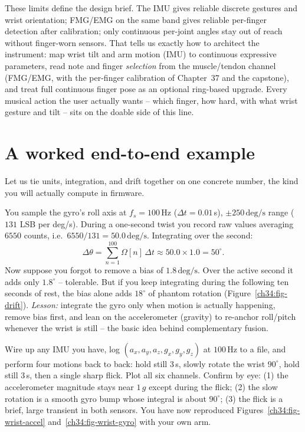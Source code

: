 \begin{aestheticbox}
These limits define the design brief. The IMU gives reliable
discrete gestures and wrist orientation; FMG/EMG on the same band gives reliable
per-finger detection after calibration; only continuous per-joint angles stay out of
reach without finger-worn sensors. That tells us exactly how to architect the
instrument: map wrist tilt and arm motion (IMU) to continuous expressive parameters,
read note and finger \emph{selection} from the muscle/tendon channel (FMG/EMG, with the
per-finger calibration of Chapter~37 and the capstone), and treat full continuous finger
pose as an optional ring-based upgrade. Every musical action the user actually wants --
which finger, how hard, with what wrist gesture and tilt -- sits on the doable side of
this line.
\end{aestheticbox}

\section{A worked end-to-end example}
\label{ch34:worked}

Let us tie units, integration, and drift together on one concrete number, the kind you
will actually compute in firmware.

\begin{example}
\label{ch34:ex-twist}
You sample the gyro's roll axis at $f_s = 100\,\mathrm{Hz}$ ($\Delta t = 0.01\,$s),
$\pm250\,\mathrm{deg/s}$ range ($131$ LSB per deg/s). During a one-second twist you
record raw values averaging $6550$ counts, i.e.\ $6550/131 = 50.0\,\mathrm{deg/s}$.
Integrating over the second:
\[
  \Delta\theta = \sum_{n=1}^{100} \Omega[n]\,\Delta t \approx 50.0 \times 1.0
  = 50^\circ .
\]
Now suppose you forgot to remove a bias of $1.8\,\mathrm{deg/s}$. Over the active
second it adds only $1.8^\circ$ -- tolerable. But if you keep integrating during the
following ten seconds of rest, the bias alone adds $18^\circ$ of phantom rotation
(Figure~\ref{ch34:fig-drift}). \emph{Lesson:} integrate the gyro only when motion is
actually happening, remove bias first, and lean on the accelerometer (gravity) to
re-anchor roll/pitch whenever the wrist is still -- the basic idea behind complementary fusion.
\end{example}

\begin{labbox}
Wire up any IMU you have, log $(a_x,a_y,a_z,g_x,g_y,g_z)$ at $100\,\mathrm{Hz}$ to a
file, and perform four motions back to back: hold still 3\,s, slowly rotate the wrist
$90^\circ$, hold still 3\,s, then a single sharp flick. Plot all six channels. Confirm
by eye: (1) the accelerometer magnitude stays near $1\,g$ except during the flick;
(2) the slow rotation is a smooth gyro bump whose integral is about $90^\circ$;
(3) the flick is a brief, large transient in both sensors. You have now reproduced
Figures~\ref{ch34:fig-wrist-accel} and~\ref{ch34:fig-wrist-gyro} with your own arm.
\end{labbox}

